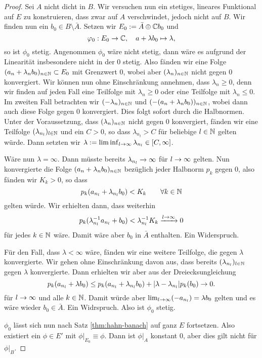 \begin{proof}
  Sei $A$ nicht dicht in $B$. Wir versuchen nun ein stetiges, lineares
  Funktional auf $E$ zu konstruieren, dass zwar auf $A$ verschwindet,
  jedoch nicht auf $B$. Wir finden nun ein $b_0 \in B \setminus
  \bar A$. Setzen wir $E_0 := \bar A \oplus \mathbb{C} b_0$ und
  \[
  \varphi_0: E_0 \rightarrow \mathbb{C}, \quad a + \lambda b_0 \mapsto \lambda,
  \]
  so ist $\phi_0$ stetig. Angenommen $\phi_0$ wäre nicht stetig, dann
  wäre es aufgrund der Linearität insbesondere nicht in der $0$
  stetig. Also fänden wir eine Folge $(a_n + \lambda_n b_0)_{n \in
    \mathbb{N}} \subset E_0$ mit Grenzwert $0$, wobei aber $(\lambda_n)_{n \in
    \mathbb{N}}$ nicht gegen 0 konvergiert. Wir können nun ohne Einschränkung
  annehmen, dass $\lambda_n \geq 0$, denn wir finden auf jeden Fall
  eine Teilfolge mit $\lambda_n \geq 0$ oder eine Teilfolge mit
  $\lambda_n \leq 0$. Im zweiten Fall betrachten wir $(-\lambda_n)_{n
    \in \mathbb{N}}$ und $(-(a_n + \lambda_n b_0))_{n \in \mathbb{N}}$, wobei dann auch
  diese Folge gegen $0$ konvergiert. Dies folgt sofort durch die
  Halbnormen. Unter der Voraussetzung, dass $(\lambda_n)_{n\in\mathbb{N}}$ nicht gegen $0$
  konvergiert, fänden wir eine Teilfolge $(\lambda_{n_l})_{l\in \mathbb{N}}$
  und ein $C > 0$, so dass $\lambda_{n_l} > C$ für beliebige $l \in
  \mathbb{N}$ gelten würde. Dann setzten wir $\lambda := \liminf_{l \rightarrow \infty}
  \lambda_{n_l} \in [C, \infty]$.

  Wäre nun $\lambda = \infty$. Dann müsste bereits
  $\lambda_{n_l} \rightarrow \infty$ für $l \rightarrow \infty$ gelten. Nun
  konvergierte die Folge $(a_n + \lambda_n b_0)_{n \in \mathbb{N}}$ bezüglich
  jeder Halbnorm $p_k$ gegen 0, also fänden wir $K_k > 0$, so dass
  \[
  p_k(a_{n_l} + \lambda_{n_l}b_0) < K_k \qquad \forall k \in \mathbb{N}
  \]
  gelten würde. Wir erhielten dann, dass weiterhin
  \[
  p_k(\lambda_{n_l}^{-1}a_{n_l} + b_0) < \lambda_{n_l}^{-1} K_k
  \xrightarrow{l \rightarrow \infty} 0
  \]
  für jedes $k \in \mathbb{N}$ wäre. Damit wäre aber $b_0$ in $\bar A$ enthalten. Ein
  Widerspruch.

  Für den Fall, dass $\lambda < \infty$ wäre, fänden wir eine weitere
  Teilfolge, die gegen $\lambda$ konvergierte. Wir gehen ohne
  Einschränkung davon aus, dass bereits $(\lambda_{n_l})_{l \in \mathbb{N}}$
  gegen $\lambda$ konvergierte. Dann erhielten wir aber aus der
  Dreiecksungleichung
  \[
  p_k(a_{n_l} + \lambda b_0) \leq p_k(a_{n_l} + \lambda_{n_l} b_0) +
  |\lambda - \lambda_{n_l}| p_k(b_0) \rightarrow 0.
  \]
  für $l \rightarrow \infty$ und alle $k \in \mathbb{N}$. Damit würde aber $\lim_{l
    \rightarrow \infty}(-a_{n_l}) = \lambda b_0$ gelten und es wäre wieder
  $b_0 \in \bar A$. Ein Widrspruch. Also ist $\phi_0$ stetig.
  
  $\phi_0$ lässt sich nun nach Satz \ref{thm:hahn-banach}
  auf ganz $E$ fortsetzen. Also existiert ein $\phi \in E'$ mit
  $\phi|_{E_0} \equiv \phi$. Dann ist $\phi|_A$ konstant 0, aber
  dies gilt nicht für $\phi|_B$.
\end{proof}

